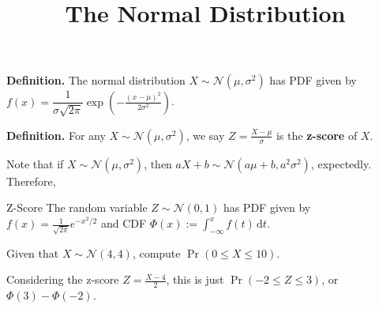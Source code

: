 \title{The Normal Distribution}



\textbf{Definition.} The normal distribution $X \sim \mathcal{N}(\mu, \sigma^2)$
has PDF given by $f(x) = \dfrac{1}{\sigma \sqrt{2\pi}} \exp\left(-\frac{(x - \mu)^2}{2 \sigma^2}\right)$.

\textbf{Definition.} For any $X \sim \mathcal{N}(\mu, \sigma^2)$,
we say $Z = \frac{X - \mu}{\sigma}$ is the \textbf{z-score} of $X$.

Note that if $X \sim \mathcal{N}(\mu, \sigma^2)$, then
$aX + b \sim \mathcal{N}(a \mu + b, a^2 \sigma^2)$, expectedly.  Therefore,

\begin{theorem}{Z-Score}
    The random variable $Z \sim \mathcal{N}(0, 1)$ has PDF given by $f(x) = \frac{1}{\sqrt{2\pi}}e^{-x^2/2}$
    and CDF $\Phi(x) := \int_{-\infty}^x f(t) \, \mathrm{d}t$.
\end{theorem}

\begin{problem}
    Given that $X \sim \mathcal{N}(4, 4)$,
    compute $\Pr(0 \leq X \leq 10)$.
\end{problem}

\begin{solution}
    Considering the z-score $Z = \frac{X - 4}{2}$,
    this is just $\Pr(-2 \leq Z \leq 3)$, or $\Phi(3) - \Phi(-2)$.
\end{solution}


